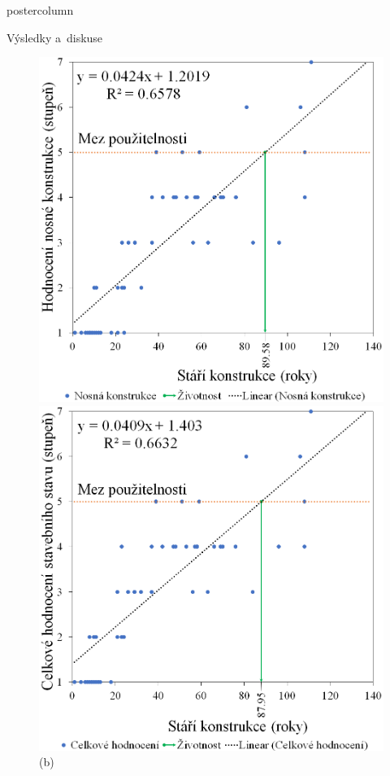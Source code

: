 \documentclass{beamer}
\begin{document}
\begin{frame}
\begin{columns}
\begin{column}{.60\textwidth}
\begin{beamercolorbox}[center]{postercolumn}
\begin{minipage}{.98\textwidth}
{\begin{myblock}{Výsledky a~diskuse}
\begin{figure}
\begin{minipage}{0.30\textwidth}
								\centering\includegraphics[width=1\textwidth]{img/3b}
								\caption*{(b)}
							\end{minipage}
							\hspace{1em}
							\begin{minipage}{0.30\textwidth}
								\centering\includegraphics[width=1\textwidth]{img/3c}

\end{minipage}
\end{figure}
\end{myblock}}
\end{minipage}
\end{beamercolorbox}
\end{column}
\end{columns}
\end{frame}
\end{document}
